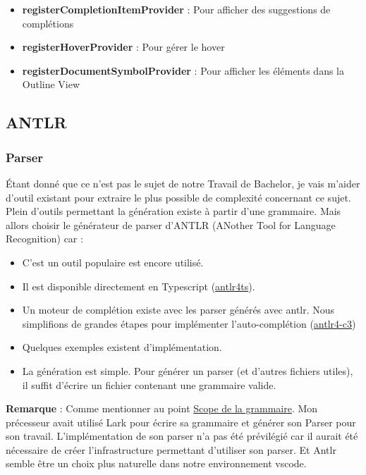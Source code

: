 \documentclass[
    iict, %
    il, %
]{heig-tb}
\begin{document}
\begin{itemize}
    \item \textbf{registerCompletionItemProvider} :  Pour afficher des suggestions de complétions
    \item \textbf{registerHoverProvider} : Pour gérer le hover
    \item \textbf{registerDocumentSymbolProvider} : Pour afficher les éléments dans la Outline View
\end{itemize}

\subsection{ANTLR}
\subsubsection{Parser}
Étant donné que ce n'est pas le sujet de notre Travail de Bachelor, je vais m'aider d'outil existant pour extraire le plus possible de complexité concernant ce sujet.
Plein d'outils permettant la génération existe à partir d'une grammaire. Mais allors choisir le générateur de parser d'ANTLR (ANother Tool for Language Recognition) car :

\begin{itemize}
    \item C'est un outil populaire est encore utilisé.
    \item Il est disponible directement en Typescript (\href{https://github.com/tunnelvisionlabs/antlr4ts}{antlr4ts}).
    \item Un moteur de complétion existe avec les parser générés avec antlr. Nous simplifions de grandes étapes pour implémenter l'auto-complétion (\href{https://github.com/mike-lischke/antlr4-c3}{antlr4-c3})
    \item Quelques exemples existent d'implémentation.
    \item La génération est simple. Pour générer un parser (et d'autres fichiers utiles), il suffit d'écrire un fichier contenant une grammaire valide.
\end{itemize}

\textbf{Remarque} :
Comme mentionner au point \hyperref[grammar scope]{Scope de la grammaire}. Mon précesseur avait utilisé Lark pour écrire sa grammaire et générer son Parser pour son travail.
L'implémentation de son parser n'a pas été prévilégié car il aurait été nécessaire de créer l'infrastructure permettant d'utiliser son parser.
Et Antlr semble être un choix plus naturelle dans notre environnement vscode.
\end{document}
